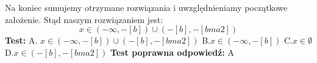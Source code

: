\documentclass[12pt, a4paper]{article}
\theoremstyle{definition} %
\newcommand{\odpStop}{\newline}                                             %
\newcommand{\testStart}{\noindent \textbf{Test:}\newline} %
\newcommand{\testStop}{\newline} %
\newcommand{\kluczStart}{\noindent \textbf{Test poprawna odpowiedź:}\newline} %
\newcommand{\kluczStop}{\newline} %
\begin{document}
Na koniec sumujemy otrzymane rozwiązania i uwzględnieniamy początkowe założenie. Stąd naszym rozwiązaniem jest: 
$$x\in(-\infty,-[b])\cup(-[b],-[bma2])$$
\odpStop
\testStart
A. $x\in(-\infty,-[b])\cup(-[b],-[bma2])$
B.$x\in(-\infty,-[b])$
C.$x\in\emptyset$
D.$x\in(-[b],-[bma2])$
\testStop
\kluczStart
A
\kluczStop
\end{document}
